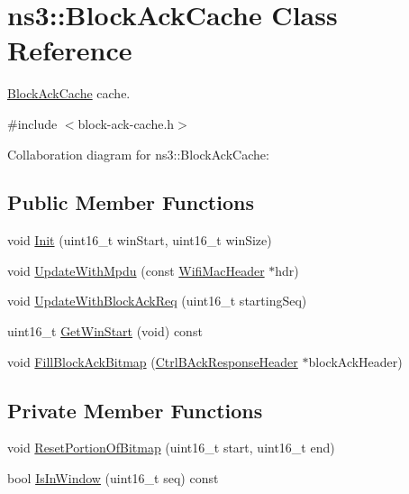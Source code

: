 \hypertarget{classns3_1_1BlockAckCache}{}\section{ns3\+:\+:Block\+Ack\+Cache Class Reference}
\label{classns3_1_1BlockAckCache}


\hyperlink{classns3_1_1BlockAckCache}{Block\+Ack\+Cache} cache.  




{\ttfamily \#include $<$block-\/ack-\/cache.\+h$>$}



Collaboration diagram for ns3\+:\+:Block\+Ack\+Cache\+:
\subsection*{Public Member Functions}
\begin{DoxyCompactItemize}
\item 
void \hyperlink{classns3_1_1BlockAckCache_a38bbf9991bacc70374daf9b9f59731e1}{Init} (uint16\+\_\+t win\+Start, uint16\+\_\+t win\+Size)
\item 
void \hyperlink{classns3_1_1BlockAckCache_ad53e955bbd3e58e1833a90894e67e6eb}{Update\+With\+Mpdu} (const \hyperlink{classns3_1_1WifiMacHeader}{Wifi\+Mac\+Header} $\ast$hdr)
\item 
void \hyperlink{classns3_1_1BlockAckCache_a269acd2840aa5d8eda4ae61ad6e9f441}{Update\+With\+Block\+Ack\+Req} (uint16\+\_\+t starting\+Seq)
\item 
uint16\+\_\+t \hyperlink{classns3_1_1BlockAckCache_a1450e20ac2524d4fd57995bf0d8261b4}{Get\+Win\+Start} (void) const 
\item 
void \hyperlink{classns3_1_1BlockAckCache_a53f2f4c162a246e6d3f5de4c32f69c01}{Fill\+Block\+Ack\+Bitmap} (\hyperlink{classns3_1_1CtrlBAckResponseHeader}{Ctrl\+B\+Ack\+Response\+Header} $\ast$block\+Ack\+Header)
\end{DoxyCompactItemize}
\subsection*{Private Member Functions}
\begin{DoxyCompactItemize}
\item 
void \hyperlink{classns3_1_1BlockAckCache_abe2341db866f7f2f309912da4be34a65}{Reset\+Portion\+Of\+Bitmap} (uint16\+\_\+t start, uint16\+\_\+t end)
\item 
bool \hyperlink{classns3_1_1BlockAckCache_a8c39e0d1c19b6f661da5155a0b27283f}{Is\+In\+Window} (uint16\+\_\+t seq) const 
\end{DoxyCompactItemize}
